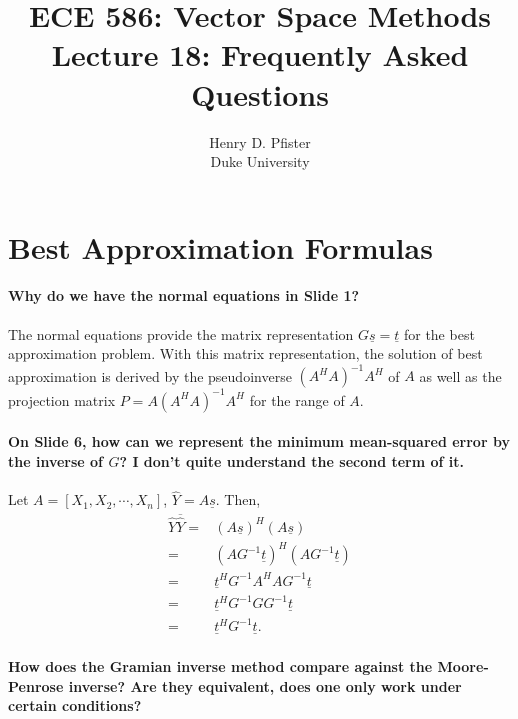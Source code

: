 \documentclass[10pt,english]{article}
\begin{document}
\title{ECE 586: Vector Space Methods \\ Lecture 18: Frequently Asked Questions}
\author{Henry D. Pfister \\ Duke University}

\maketitle

\section{Best Approximation Formulas}

\paragraph{Why do we have the normal equations in Slide 1?}

The normal equations provide the matrix representation $G\underline{s}=\underline{t}$ for the best approximation problem. With this matrix representation, the solution of best approximation is derived by the pseudoinverse $(A^HA)^{-1}A^H$ of $A$ as well as the projection matrix $P=A(A^HA)^{-1}A^H$ for the range of $A$.

\paragraph{On Slide 6, how can we represent the minimum mean-squared error by the inverse of $G$? I don't quite understand the second term of it.}
Let $A = [X_1, X_2, \cdots, X_n]$, $\hat{Y}=A\underline{s}$. Then,
\begin{equation*}
	\begin{aligned}
		\hat{Y}\overline{\hat{Y}} = & (A\underline{s})^H(A\underline{s}) \\
		= & (AG^{-1}\underline{t})^H(AG^{-1}\underline{t}) \\
		= & \underline{t}^HG^{-1}A^HAG^{-1}\underline{t} \\
		= & \underline{t}^HG^{-1}GG^{-1}\underline{t} \\
		= & \underline{t}^HG^{-1}\underline{t}.
	\end{aligned}
\end{equation*}


\paragraph{How does the Gramian inverse method compare against the Moore-Penrose inverse? Are they equivalent, does one only work under certain conditions?}
\end{document}
